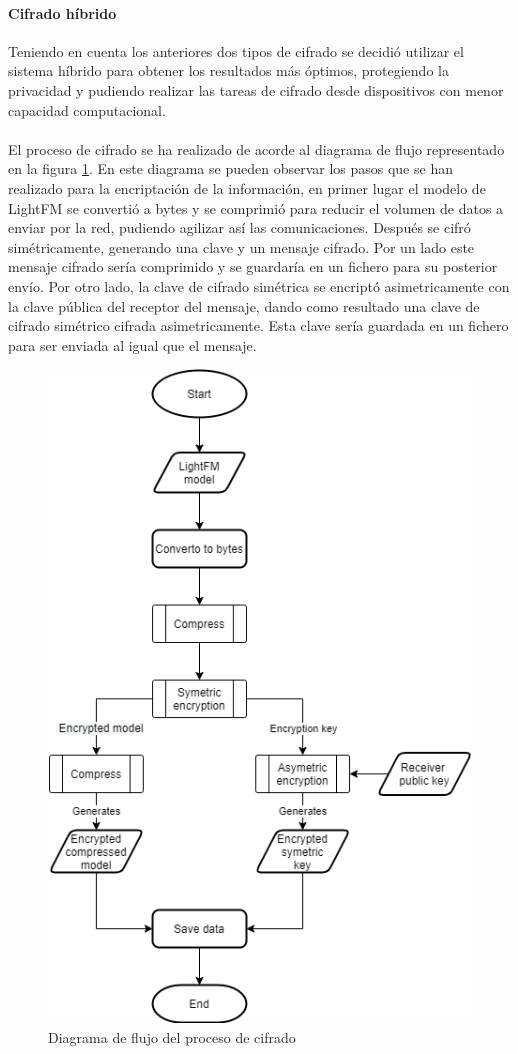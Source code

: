 \paragraph{Cifrado híbrido}
Teniendo en cuenta los anteriores dos tipos de cifrado se decidió utilizar el sistema híbrido para obtener los resultados más óptimos, protegiendo la privacidad y pudiendo realizar las tareas de cifrado desde dispositivos con menor capacidad computacional.
\\ \\ 
El proceso de cifrado se ha realizado de acorde al diagrama de flujo representado en la figura \ref{fig:Flow_Encryption}. En este diagrama se pueden observar los pasos que se han realizado para la encriptación de la información, en primer lugar el modelo de LightFM se convertió a bytes y se comprimió para reducir el volumen de datos a enviar por la red, pudiendo agilizar así las comunicaciones. Después se cifró simétricamente, generando una clave y un mensaje cifrado. Por un lado este mensaje cifrado sería comprimido y se guardaría en un fichero para su posterior envío. Por otro lado, la clave de cifrado simétrica se encriptó asimetricamente con la clave pública del receptor del mensaje, dando como resultado una clave de cifrado simétrico cifrada asimetricamente. Esta clave sería guardada en un fichero para ser enviada al igual que el mensaje.
\begin{figure}[H]
    \centering
    \includegraphics[height=0.6\textheight]{Figuras/flowchart_encryption.png}    
    \caption{Diagrama de flujo del proceso de cifrado} 
    \label{fig:Flow_Encryption}
\end{figure}


